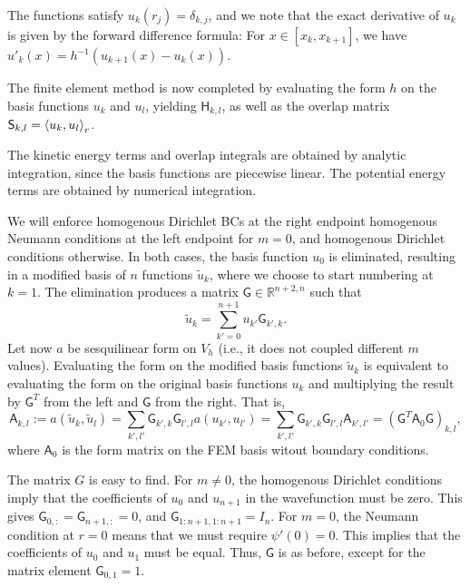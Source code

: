 \documentclass{article}
\newcommand{\RR}{\mathbb{R}}
\begin{document}
The functions satisfy $u_k(r_j) = \delta_{k,j}$, and we note that the exact derivative of $u_k$ is given by the forward difference formula: For $x \in [x_k, x_{k+1}]$, we have $u'_k(x) = h^{-1} (u_{k+1}(x) - u_k(x))$.

The finite element method is now completed by evaluating the form $h$ on the basis functions $u_k$ and $u_l$, yielding $\mathsf{H}_{k,l}$, as well as the overlap matrix $\mathsf{S}_{k,l} = \braket{u_k,u_l}_r$. 

The kinetic energy terms and overlap integrals are obtained by analytic integration, since the basis functions are piecewise linear. The potential energy terms are obtained by numerical integration. 

We will enforce homogenous Dirichlet BCs at the right endpoint homogenous Neumann conditions at the left endpoint for $m=0$, and homogenous Dirichlet conditions otherwise. In both cases, the basis function $u_0$ is eliminated, resulting in a modified basis of $n$ functions $\tilde{u}_k$, where we choose to start numbering at $k=1$. The elimination produces a matrix $\mathsf{G} \in \RR^{n+2,n}$ such that
\begin{equation}
    \tilde{u}_k = \sum_{k'=0}^{n+1} u_{k'} \mathsf{G}_{k',k} .
\end{equation}
Let now $a$ be sesquilinear form on $V_h$ (i.e., it does not coupled different $m$ values). Evaluating the form on the modified basis functions $\tilde{u}_k$ is equivalent to evaluating the form on the original basis functions $u_k$ and multiplying the result by $\mathsf{G}^T$ from the left and $\mathsf{G}$ from the right. That is,
\begin{equation}
    \mathsf{A}_{k,l} := a(\tilde{u}_k, \tilde{u}_l) = \sum_{k',l'} \mathsf{G}_{k',k} \mathsf{G}_{l',l} a(u_{k'}, u_{l'}) = \sum_{k',l'} \mathsf{G}_{k',k} \mathsf{G}_{l',l} \mathsf{A}_{k',l'} = (\mathsf{G}^T \mathsf{A}_0 \mathsf{G})_{k,l},
\end{equation}
where $\mathsf{A}_0$ is the form matrix on the FEM basis witout boundary conditions. 

The matrix $G$ is easy to find. For $m\neq 0$, the homogenous Dirichlet conditions imply that the coefficients of $u_0$ and $u_{n+1}$ in the wavefunction must be zero. This gives $\mathsf{G}_{0,:} = \mathsf{G}_{n+1,:} = 0$, and $\mathsf{G}_{1:n+1, 1:n+1} = I_n$. For $m=0$, the Neumann condition at $r=0$ means that we must require $\psi'(0) = 0$. This implies that the coefficients of $u_0$ and $u_1$ must be equal. Thus, $\mathsf{G}$ is as before, except for the matrix element $\mathsf{G}_{0,1} = 1$.
\end{document}
